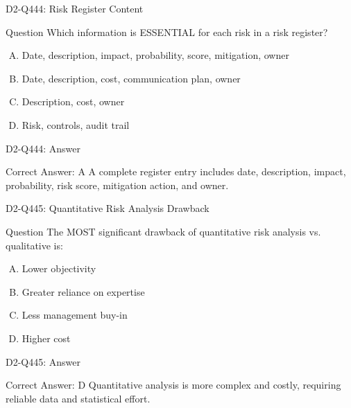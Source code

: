 \documentclass{beamer}
\begin{document}
\begin{frame}{D2-Q444: Risk Register Content}
	\begin{block}{Question}
		Which information is ESSENTIAL for each risk in a risk register?
	\end{block}
	\begin{enumerate}[(A)]
		\item Date, description, impact, probability, score, mitigation, owner
		\item Date, description, cost, communication plan, owner
		\item Description, cost, owner
		\item Risk, controls, audit trail
	\end{enumerate}
\end{frame}
\begin{frame}{D2-Q444: Answer}
	\begin{block}{Correct Answer: A}
		A complete register entry includes date, description, impact, probability, risk score, mitigation action, and owner.
	\end{block}
\end{frame}

\begin{frame}{D2-Q445: Quantitative Risk Analysis Drawback}
	\begin{block}{Question}
		The MOST significant drawback of quantitative risk analysis vs. qualitative is:
	\end{block}
	\begin{enumerate}[(A)]
		\item Lower objectivity
		\item Greater reliance on expertise
		\item Less management buy-in
		\item Higher cost
	\end{enumerate}
\end{frame}
\begin{frame}{D2-Q445: Answer}
	\begin{block}{Correct Answer: D}
		Quantitative analysis is more complex and costly, requiring reliable data and statistical effort.
	\end{block}
\end{frame}
\end{document}
